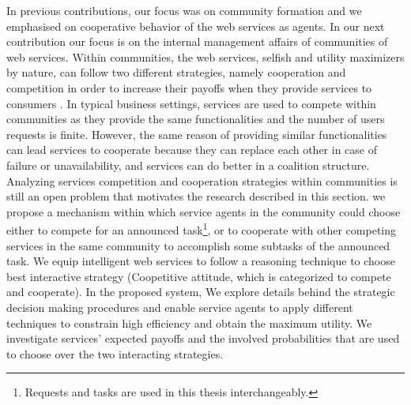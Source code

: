 In previous contributions, our focus was on community formation and we emphasised on cooperative behavior of the web services as agents. In our next contribution our focus is on the internal management affairs of communities of web services. Within communities, the web services, selfish and utility maximizers by nature, can follow two different strategies, namely cooperation and competition in order to increase their payoffs when they provide services to consumers \cite{VuFind-10008938119}. In typical business settings, services are used to compete within communities as they provide the same functionalities and the number of users requests is finite. However, the same reason of providing similar functionalities can lead services to cooperate because they can replace each other in case of failure or unavailability, and services can do better in a coalition structure. Analyzing services competition and cooperation strategies within communities is still an open problem that motivates the research described in this section. we propose a mechanism within which service agents
in the community could choose either to compete for an announced task\footnote{Requests and tasks are used in this thesis interchangeably.}, or to cooperate with other competing services in the same community to accomplish some subtasks of the announced task. We equip intelligent web services to follow a reasoning technique to choose best interactive strategy (Coopetitive attitude, which is categorized to compete and cooperate). In the proposed system, We explore details behind the strategic decision making procedures and enable service agents to apply different techniques to constrain high efficiency and obtain the maximum utility. We investigate services' expected payoffs and the involved probabilities that are used to choose over the two interacting strategies.



